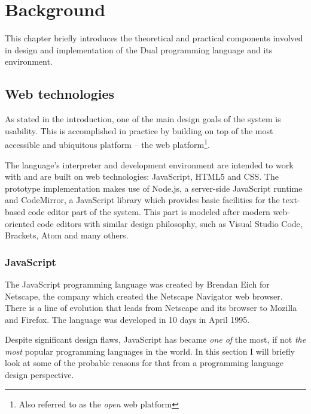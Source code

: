 \chapter{Background}\label{chap:background}
This chapter briefly introduces the theoretical and practical components
involved in design and implementation of the Dual programming language and its
environment. 

\section{Web technologies}
As stated in the introduction, one of the main design goals of the system is usability. This is accomplished in practice by building on top of the most accessible and ubiquitous platform -- the web platform\cite{web_platform}\footnote{Also referred to as the \textit{open} web platform\cite{open_web_platform}}.

The language's interpreter and development environment are intended to work with
and are built on web technologies: JavaScript, HTML5 and CSS. The prototype
implementation makes use of Node.js, a server-side JavaScript runtime\cite{nodejs_site} and
CodeMirror, a JavaScript library which provides basic facilities for the text-based code editor part of the system\cite{codemirror_site}. This part is modeled after modern web-oriented code editors with similar design philosophy\cite{js_text_editors_wikipedia}, such as Visual Studio Code\cite{vscode_site}, Brackets\cite{brackets_site}, Atom\cite{atom_site} and many others.

\subsection{JavaScript}
The JavaScript programming language was created by Brendan Eich for Netscape\cite[Introduction]{ecmascript}, the company which created the Netscape Navigator web browser. There is a line of evolution that leads from Netscape and its browser to Mozilla and Firefox\cite{netscape_mozilla, mozilla_story}. The language was developed in 10 days in April 1995\cite{js_ten_days}.

Despite significant design flaws, JavaScript has became \textit{one of} the most\cite{tiobe, pypl}, if not \textit{the most}\cite[Section~Most Popular Technologies per Dev Type]{so_developer_survey_2016}\cite{redmonk} popular programming languages in the world. In this section I will briefly look at some of the probable reasons for that from a programming language design perspective.

